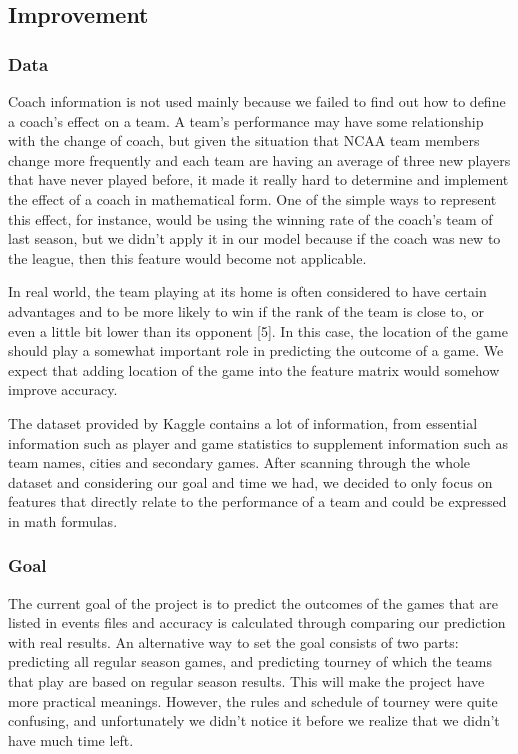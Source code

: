 \documentclass[12pt]{article}
\begin{document}
\subsection{Improvement}

\subsubsection{Data}

\quad Coach information is not used mainly because we failed to find out how to define a coach’s effect on a team. A team’s performance may have some relationship with the change of coach, but given the situation that NCAA team members change more frequently and each team are having an average of three new players that have never played before, it made it really hard to determine and implement the effect of a coach in mathematical form. One of the simple ways to represent this effect, for instance, would be using the winning rate of the coach’s team of last season, but we didn’t apply it in our model because if the coach was new to the league, then this feature would become not applicable. 


\quad In real world, the team playing at its home is often considered to have certain advantages and to be more likely to win if the rank of the team is close to, or even a little bit lower than its opponent [5]. In this case, the location of the game should play a somewhat important role in predicting the outcome of a game. We expect that adding location of the game into the feature matrix would somehow improve accuracy.


\quad The dataset provided by Kaggle contains a lot of information, from essential information such as player and game statistics to supplement information such as team names, cities and secondary games. After scanning through the whole dataset and considering our goal and time we had, we decided to only focus on features that directly relate to the performance of a team and could be expressed in math formulas.

\subsubsection{Goal}

\quad The current goal of the project is to predict the outcomes of the games that are listed in events files and accuracy is calculated through comparing our prediction with real results. An alternative way to set the goal consists of two parts: predicting all regular season games, and predicting tourney of which the teams that play are based on regular season results. This will make the project have more practical meanings. However, the rules and schedule of tourney were quite confusing, and unfortunately we didn’t notice it before we realize that we didn’t have much time left.
\end{document}

